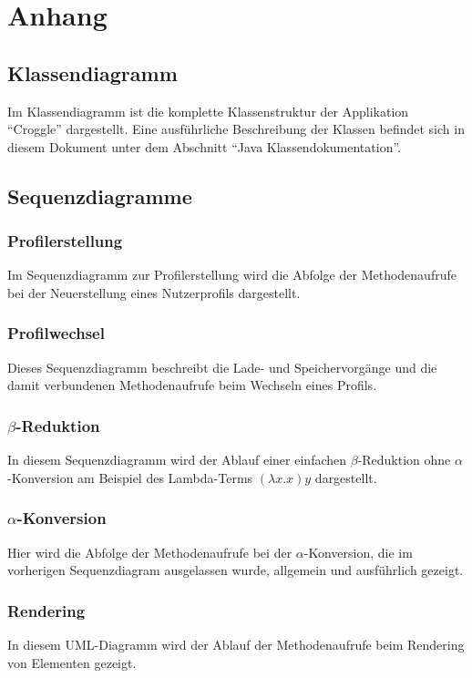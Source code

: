 \chapter{Anhang}
\section{Klassendiagramm}
	Im Klassendiagramm ist die komplette Klassenstruktur der Applikation "`Croggle"' dargestellt. 
	Eine ausführliche Beschreibung der Klassen befindet sich in diesem Dokument unter dem Abschnitt "`Java Klassendokumentation"'. 

\section{Sequenzdiagramme}
	\subsection{Profilerstellung}
		Im Sequenzdiagramm zur Profilerstellung wird die Abfolge der Methodenaufrufe bei der Neuerstellung eines Nutzerprofils dargestellt.

	\subsection{Profilwechsel}
		Dieses Sequenzdiagramm beschreibt die Lade- und Speichervorgänge und die damit verbundenen Methodenaufrufe beim Wechseln eines Profils. 

	\subsection{\(\beta\)-Reduktion}
		In diesem Sequenzdiagramm wird der Ablauf einer einfachen \(\beta\)-Reduktion ohne \(\alpha\)-Konversion am Beispiel des Lambda-Terms \((\lambda x.x) y\) dargestellt.

	\subsection{\(\alpha\)-Konversion}
		Hier wird die Abfolge der Methodenaufrufe bei der \(\alpha\)-Konversion, die im vorherigen Sequenzdiagram ausgelassen wurde, allgemein und ausführlich gezeigt.  

	\subsection{Rendering}
		In diesem UML-Diagramm wird der Ablauf der Methodenaufrufe beim Rendering von Elementen gezeigt.
